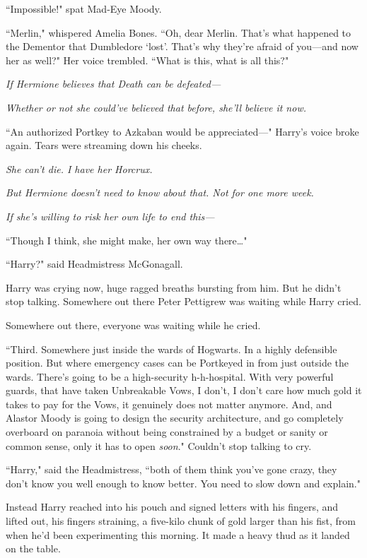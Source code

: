 ``Impossible!" spat Mad-Eye Moody.

``Merlin," whispered Amelia Bones. ``Oh, dear Merlin. That's what happened to the Dementor that Dumbledore `lost'. That's why they're afraid of you---and now her as well?" Her voice trembled. ``What is this, what is all this?"

\emph{If Hermione believes that Death can be defeated---}

\emph{Whether or not she could've believed that before, she'll believe it now.}

``An authorized Portkey to Azkaban would be appreciated---" Harry's voice broke again. Tears were streaming down his cheeks.

\emph{She can't die. I have her Horcrux.}

\emph{But Hermione doesn't need to know about that. Not for one more week.}

\emph{If she's willing to risk her own life to end this---}

``Though I think, she might make, her own way there{\ldots}"

``Harry?" said Headmistress McGonagall.

Harry was crying now, huge ragged breaths bursting from him. But he didn't stop talking. Somewhere out there Peter Pettigrew was waiting while Harry cried.

Somewhere out there, everyone was waiting while he cried.

``Third. Somewhere just inside the wards of Hogwarts. In a highly defensible position. But where emergency cases can be Portkeyed in from just outside the wards. There's going to be a high-security h-h-hospital. With very powerful guards, that have taken Unbreakable Vows, I don't, I don't care how much gold it takes to pay for the Vows, it genuinely does not matter anymore. And, and Alastor Moody is going to design the security architecture, and go completely overboard on paranoia without being constrained by a budget or sanity or common sense, only it has to open \emph{soon}." Couldn't stop talking to cry.

``Harry," said the Headmistress, ``both of them think you've gone crazy, they don't know you well enough to know better. You need to slow down and explain."

Instead Harry reached into his pouch and signed letters with his fingers, and lifted out, his fingers straining, a five-kilo chunk of gold larger than his fist, from when he'd been experimenting this morning. It made a heavy thud as it landed on the table.

